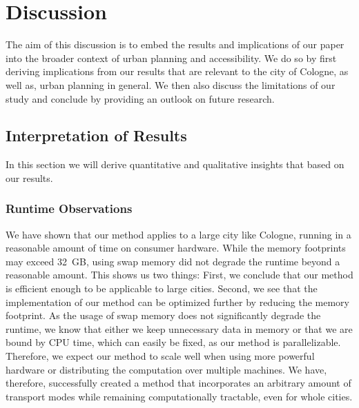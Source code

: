 \clearpage
\section{Discussion}
\label{sec:discussion}

The aim of this discussion is to embed the results and implications of our paper into the broader context of urban planning and accessibility.
We do so by first deriving implications from our results that are relevant to the city of Cologne, as well as, urban planning in general.
We then also discuss the limitations of our study and conclude by providing an outlook on future research.

\subsection{Interpretation of Results}
\label{subsec:interpretation_of_results}

In this section we will derive quantitative and qualitative insights that based on our results.

\subsubsection{Runtime Observations}
We have shown that our method applies to a large city like Cologne, running in a reasonable amount of time on consumer hardware.
While the memory footprints may exceed 32 GB, using swap memory did not degrade the runtime beyond a reasonable amount.
This shows us two things:
First, we conclude that our method is efficient enough to be applicable to large cities.
Second, we see that the implementation of our method can be optimized further by reducing the memory footprint.
As the usage of swap memory does not significantly degrade the runtime, we know that either we keep unnecessary data in memory or that we are bound by CPU time, which can easily be fixed, as our method is parallelizable.
Therefore, we expect our method to scale well when using more powerful hardware or distributing the computation over multiple machines.
We have, therefore, successfully created a method that incorporates an arbitrary amount of transport modes while remaining computationally tractable, even for whole cities.

